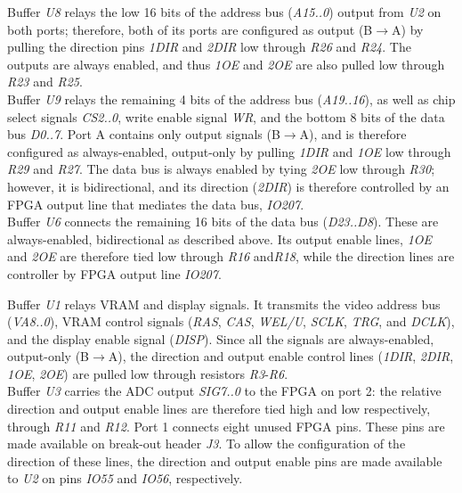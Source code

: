 \documentclass[titlepage]{scrartcl}
\begin{document}
	Buffer \textit{U8} relays the low 16 bits of the address bus (\textit{A15..0}) output from \textit{U2} on both ports; therefore, both of its ports are configured as output (B$\rightarrow$A) by pulling the direction pins \textit{1DIR} and \textit{2DIR} low through \textit{R26} and \textit{R24}. The outputs are always enabled, and thus \textit{1OE} and \textit{2OE} are also pulled low through \textit{R23} and \textit{R25}.\\

	Buffer \textit{U9} relays the remaining 4 bits of the address bus (\textit{A19..16}), as well as chip select signals \textit{CS2..0}, write enable signal \textit{WR}, and the bottom 8 bits of the data bus \textit{D0..7}. Port A contains only output signals (B$\rightarrow$A), and is therefore configured as always-enabled, output-only by pulling \textit{1DIR} and \textit{1OE} low through \textit{R29} and \textit{R27}. The data bus is always enabled by tying \textit{2OE} low through \textit{R30}; however, it is bidirectional, and its direction (\textit{2DIR}) is therefore controlled by an FPGA output line that mediates the data bus, \textit{IO207}.\\

	Buffer \textit{U6} connects the remaining 16 bits of the data bus (\textit{D23..D8}). These are always-enabled, bidirectional as described above. Its output enable lines, \textit{1OE} and \textit{2OE} are therefore tied low through \textit{R16} and\textit{R18}, while the direction lines are controller by FPGA output line \textit{IO207}.

	Buffer \textit{U1} relays VRAM and display signals. It transmits the video address bus (\textit{VA8..0}), VRAM control signals (\textit{RAS}, \textit{CAS}, \textit{WEL/U}, \textit{SCLK}, \textit{TRG}, and \textit{DCLK}), and the display enable signal (\textit{DISP}). Since all the signals are always-enabled, output-only (B$\rightarrow$A), the direction and output enable control lines (\textit{1DIR}, \textit{2DIR}, \textit{1OE}, \textit{2OE}) are pulled low through resistors \textit{R3}-\textit{R6}.\\

	Buffer \textit{U3} carries the ADC output \textit{SIG7..0} to the FPGA on port 2: the relative direction and output enable lines are therefore tied high and low respectively, through \textit{R11} and \textit{R12}. Port 1 connects eight unused FPGA pins. These pins are made available on break-out header \textit{J3}. To allow the configuration of the direction of these lines, the direction and output enable pins are made available to \textit{U2} on pins \textit{IO55} and \textit{IO56}, respectively.\\
\end{document}
